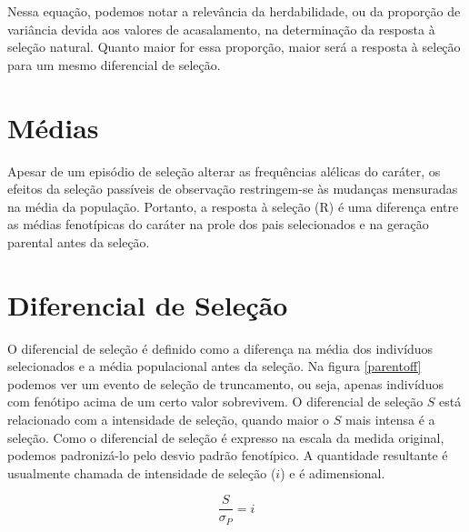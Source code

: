 \documentclass[portuges,]{tufte-handout}
\begin{document}
Nessa equação, podemos notar a relevância da herdabilidade, ou da
proporção de variância devida aos valores de acasalamento, na
determinação da resposta à seleção natural. Quanto maior for essa
proporção, maior será a resposta à seleção para um mesmo diferencial de
seleção.

\section{Médias}\label{muxe9dias}

Apesar de um episódio de seleção alterar as frequências alélicas do
caráter, os efeitos da seleção passíveis de observação restringem-se às
mudanças mensuradas na média da população. Portanto, a resposta à
seleção (R) é uma diferença entre as médias fenotípicas do caráter na
prole dos pais selecionados e na geração parental antes da seleção.

\section{Diferencial de Seleção}\label{diferencial-de-seleuxe7uxe3o}

O diferencial de seleção é definido como a diferença na média dos
indivíduos selecionados e a média populacional antes da seleção. Na
figura \ref{parentoff} podemos ver um evento de seleção de truncamento,
ou seja, apenas indivíduos com fenótipo acima de um certo valor
sobrevivem. O diferencial de seleção \(S\) está relacionado com a
intensidade de seleção, quando maior o \(S\) mais intensa é a seleção.
Como o diferencial de seleção é expresso na escala da medida original,
podemos padronizá-lo pelo desvio padrão fenotípico. A quantidade
resultante é usualmente chamada de intensidade de seleção (\(i\)) e é
adimensional.

\[
\frac{S}{\sigma_P} = i
\]
\end{document}
